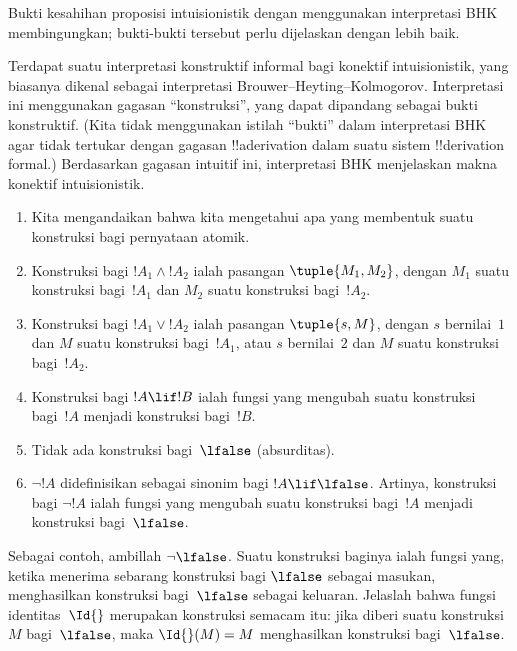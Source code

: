 \documentclass[../../../include/open-logic-section]{subfiles}
\begin{document}


\begin{editorial}
  Bukti kesahihan proposisi intuisionistik dengan menggunakan interpretasi
  BHK membingungkan; bukti-bukti tersebut perlu dijelaskan dengan lebih baik.
\end{editorial}

Terdapat suatu interpretasi konstruktif informal bagi konektif intuisionistik,
yang biasanya dikenal sebagai interpretasi Brouwer--Heyting--Kolmogorov.
Interpretasi ini menggunakan gagasan ``konstruksi'', yang dapat dipandang
sebagai bukti konstruktif. (Kita tidak menggunakan istilah ``bukti'' dalam
interpretasi BHK agar tidak tertukar dengan gagasan !!a{derivation} dalam suatu
sistem !!{derivation} formal.) Berdasarkan gagasan intuitif ini, interpretasi
BHK menjelaskan makna konektif intuisionistik.

\begin{enumerate}
\item Kita mengandaikan bahwa kita mengetahui apa yang membentuk suatu
  konstruksi bagi pernyataan atomik.
\item Konstruksi bagi $!A_1 \land !A_2$ ialah pasangan $\tuple{M_1, M_2}$,
  dengan $M_1$ suatu konstruksi bagi~$!A_1$ dan $M_2$ suatu konstruksi
  bagi~$!A_2$.
\item Konstruksi bagi $!A_1 \lor !A_2$ ialah pasangan $\tuple{s, M}$,
  dengan $s$ bernilai~$1$ dan $M$ suatu konstruksi bagi~$!A_1$, atau $s$
  bernilai~$2$ dan $M$ suatu konstruksi bagi~$!A_2$.
\item Konstruksi bagi $!A \lif !B$ ialah fungsi yang mengubah suatu konstruksi
  bagi~$!A$ menjadi konstruksi bagi~$!B$.
\item Tidak ada konstruksi bagi~$\lfalse$ (absurditas).
\item $\lnot !A$ didefinisikan sebagai sinonim bagi $!A \lif \lfalse$.
  Artinya, konstruksi bagi $\lnot !A$ ialah fungsi yang mengubah suatu
  konstruksi bagi~$!A$ menjadi konstruksi bagi~$\lfalse$.
\end{enumerate}

\begin{ex}
Sebagai contoh, ambillah $\lnot \lfalse$. Suatu konstruksi baginya ialah
fungsi yang, ketika menerima sebarang konstruksi bagi $\lfalse$ sebagai
masukan, menghasilkan konstruksi bagi~$\lfalse$ sebagai keluaran. Jelaslah
bahwa fungsi identitas~$\Id{}$ merupakan konstruksi semacam itu: jika diberi
suatu konstruksi~$M$ bagi~$\lfalse$, maka $\Id{}(M) = M$ menghasilkan
konstruksi bagi~$\lfalse$.
\end{ex}
\end{document}

